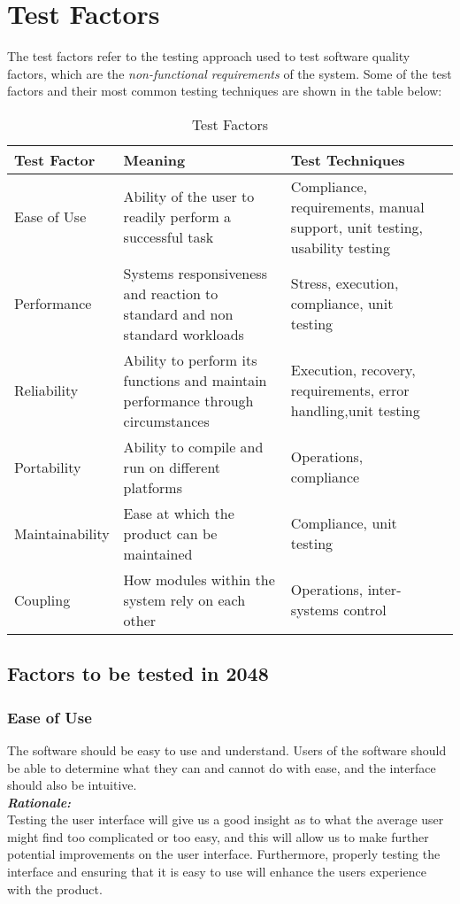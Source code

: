 \documentclass[12pt]{article}
\begin{document}
\section{Test Factors}
The test factors refer to the testing approach used to test software quality
factors, which are the \emph{non-functional requirements} of the system. Some
of the test factors and their most common testing techniques are shown in the
table below:
\begin{table}[!htbp]
	\centering
	\begin{tabular}{ | l |p{5cm}|p{5cm}| l | |}
		\hline
		Test Factor & Meaning & Test Techniques \\ \hline
		Ease of Use & Ability of the user to readily perform a successful task
		& Compliance, requirements, manual support, unit testing, usability
		testing \\ \hline
		Performance & Systems responsiveness and reaction to standard and non
		standard workloads & Stress, execution, compliance, unit testing \\
		\hline
		Reliability & Ability to perform its functions and maintain performance
		through circumstances & Execution, recovery, requirements, error
		handling,unit testing  \\ \hline
		Portability & Ability to compile and run on different platforms &
		Operations, compliance \\ \hline
		Maintainability & Ease at which the product can be maintained &
		Compliance, unit testing \\ \hline
		Coupling & How modules within the system rely on each other &
		Operations, inter-systems control \\
		\hline
	\end{tabular}
	\caption{Test Factors}
\end{table}

\subsection{Factors to be tested in 2048}
\subsubsection{Ease of Use}
The software should be easy to use and understand. Users of the software should
be able to determine what they can and cannot do with ease, and the interface
should also be intuitive.\\

\textbf{\emph{Rationale:}}\\
Testing the user interface will give us a good insight as to what the average
user might find too complicated or too easy, and this will allow us to make
further potential improvements on the user interface. Furthermore, properly
testing the interface and ensuring that it is easy to use will enhance the
users experience with the product. \\
\end{document}
